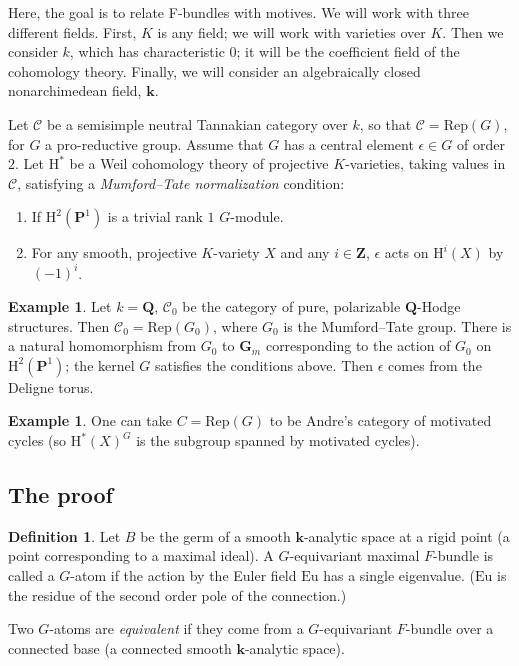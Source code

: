 \documentclass[11pt, reqno]{amsart}
\numberwithin{equation}{section}
\theoremstyle{plain}
\theoremstyle{definition}
\newtheorem{definition}[theorem]{Definition}
\newtheorem{example}[theorem]{Example}
\theoremstyle{italicsname}
\newcommand{\cC}{\mathscr{C}}
\newcommand{\rH}{\mathrm{H}}
\newcommand{\bG}{\mathbf{G}}
\newcommand{\bZ}{\mathbf{Z}}
\newcommand{\bP}{\mathbf{P}}
\newcommand{\bQ}{\mathbf{Q}}
\newcommand{\bk}{\mathbf{k}}
\newcommand{\euler}{\mathrm{Eu}}
\newcommand{\james}[1]{\leavevmode{\color{magenta}{#1}}}
\begin{document}
Here, the goal is to relate F-bundles with motives. We will work with three different fields. First, $K$ is any field; we will work with varieties over $K$. Then we consider $k$, which has characteristic $0$; it will be the coefficient field of the cohomology theory. Finally, we will consider an algebraically closed nonarchimedean field, $\bk$. \james{Previously, this was denoted $k$. Sorry!}

Let $\cC$ be a semisimple neutral Tannakian category over $k$, so that $\cC = \mathrm{Rep}(G)$, for $G$ a pro-reductive group. Assume that $G$ has a central element $\epsilon \in G$ of order $2$. Let $\rH^*$ be a Weil cohomology theory of projective $K$-varieties, taking values in $\cC$, satisfying a \emph{Mumford--Tate normalization} condition: 
\begin{enumerate} [label = (\arabic*)]
    \item If $\rH^2(\bP^1)$ is a trivial rank $1$ $G$-module. 
    \item For any smooth, projective $K$-variety $X$ and any $i \in \bZ$, $\epsilon$ acts on $\rH^i(X)$ by $(-1)^i$.
\end{enumerate}

\begin{example}
    Let $k = \bQ$, $\cC_0$ be the category of pure, polarizable $\bQ$-Hodge structures. Then $\cC_0 = \mathrm{Rep}(G_0)$, where $G_0$ is the Mumford--Tate group. There is a natural homomorphism from $G_0$ to $\bG_m$ corresponding to the action of $G_0$ on $\rH^2(\bP^1)$; the kernel $G$ satisfies the conditions above. Then $\epsilon$ comes from the Deligne torus. 
\end{example}

\begin{example}
    One can take $C = \mathrm{Rep}(G)$ to be Andre's category of motivated cycles (so $\rH^*(X)^G$ is the subgroup spanned by motivated cycles).
\end{example}

\subsection*{The proof}

\begin{definition}
Let $B$ be the germ of a smooth $\bk$-analytic space at a rigid point (a point corresponding to a maximal ideal). A $G$-equivariant maximal $F$-bundle is called a $G$-atom if the action by the Euler field $\euler$ has a single eigenvalue. ($\euler$ is the residue of the second order pole of the connection.)

Two $G$-atoms are \emph{equivalent} if they come from a $G$-equivariant $F$-bundle over a connected base (a connected smooth $\bk$-analytic space).
\end{definition}
\end{document}
